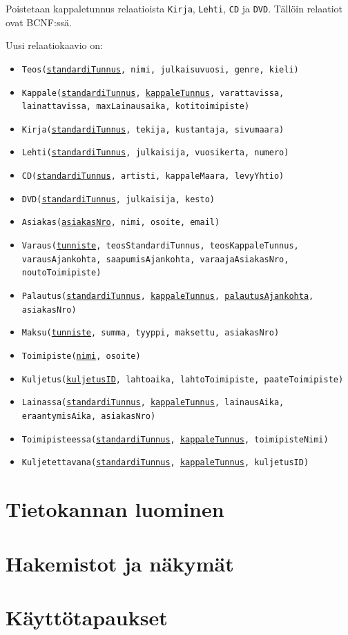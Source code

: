 \documentclass[12pt,titlepage] {article}
\begin{document}
Poistetaan kappaletunnus relaatioista \texttt{Kirja}, \texttt{Lehti}, \texttt{CD} ja \texttt{DVD}. Tällöin relaatiot ovat BCNF:ssä.

Uusi relaatiokaavio on:

\begin{itemize}
	\item \texttt{Teos(\underline{standardiTunnus}, nimi, julkaisuvuosi, genre, kieli)}
	\item \texttt{Kappale(\underline{standardiTunnus}, \underline{kappaleTunnus}, varattavissa, lainattavissa, maxLainausaika, kotitoimipiste)}
	\item \texttt{Kirja(\underline{standardiTunnus}, tekija, kustantaja, sivumaara)}
	\item \texttt{Lehti(\underline{standardiTunnus}, julkaisija, vuosikerta, numero)}
	\item \texttt{CD(\underline{standardiTunnus}, artisti, kappaleMaara, levyYhtio)}
	\item \texttt{DVD(\underline{standardiTunnus}, julkaisija, kesto)}
	\item \texttt{Asiakas(\underline{asiakasNro}, nimi, osoite, email)}
	\item \texttt{Varaus(\underline{tunniste}, teosStandardiTunnus, teosKappaleTunnus, varausAjankohta, saapumisAjankohta, varaajaAsiakasNro, noutoToimipiste)}
	\item \texttt{Palautus(\underline{standardiTunnus}, \underline{kappaleTunnus}, \underline{palautusAjankohta}, asiakasNro)}
	\item \texttt{Maksu(\underline{tunniste}, summa, tyyppi, maksettu, asiakasNro)}
	\item \texttt{Toimipiste(\underline{nimi}, osoite)}
	\item \texttt{Kuljetus(\underline{kuljetusID}, lahtoaika, lahtoToimipiste, paateToimipiste)}
\end{itemize}

\begin{itemize}
	\item \texttt{Lainassa(\underline{standardiTunnus}, \underline{kappaleTunnus}, lainausAika, eraantymisAika, asiakasNro)}
	\item \texttt{Toimipisteessa(\underline{standardiTunnus}, \underline{kappaleTunnus}, toimipisteNimi)}
	\item \texttt{Kuljetettavana(\underline{standardiTunnus}, \underline{kappaleTunnus}, kuljetusID)}
\end{itemize}

\section {Tietokannan luominen}



\section {Hakemistot ja näkymät}



\section {Käyttötapaukset}


\end{document}
